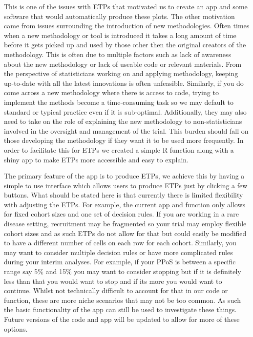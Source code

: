This is one of the issues with ETPs that motivated us to create an app and some software that would automatically produce these plots. The other motivation came from issues surrounding the introduction of new methodologies. Often times when a new methodology or tool is introduced it takes a long amount of time before it gets picked up and used by those other then the original creators of the methodology. This is often due to multiple factors such as lack of awareness about the new methodology or lack of useable code or relevant materials. From the perspective of statisticians working on and applying methodology, keeping up-to-date with all the latest innovations is often unfeasible. Similarly, if you do come across a new methodology where there is access to code, trying to implement the methods become a time-consuming task so we may default to standard or typical practice even if it is sub-optimal. Additionally, they may also need to take on the role of explaining the new methodology to non-statisticians involved in the oversight and management of the trial. This burden should fall on those developing the methodology if they want it to be used more frequently. In order to facilitate this for ETPs we created a simple R function along with a shiny app to make ETPs more accessible and easy to explain. 

The primary feature of the app is to produce ETPs, we achieve this by having a simple to use interface which allows users to produce ETPs just by clicking a few buttons. What should be stated here is that currently there is limited flexibility with adjusting the ETPs. For example, the current app and function only allows for fixed cohort sizes and one set of decision rules. If you are working in a rare disease setting, recruitment may be fragmented so your trial may employ flexible cohort sizes and as such ETPs do not allow for that but could easily be modified to have a different number of cells on each row for each cohort. Similarly, you may want to consider multiple decision rules or have more complicated rules during your interim analyses. For example, if your PPoS is between a specific range say 5\% and 15\% you may want to consider stopping but if it is definitely less than that you would want to stop and if its more you would want to continue. Whilst not technically difficult to account for that in our code or function, these are more niche scenarios that may not be too common. As such the basic functionality of the app can still be used to investigate these things. Future versions of the code and app will be updated to allow for more of these options.


